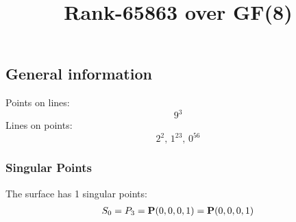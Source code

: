 \documentclass{article}
\newcommand\setTBstruts{\def\T{\rule{0pt}{2.6ex}}%
\def\B{\rule[-1.2ex]{0pt}{0pt}}}
\newcommand{\bP}{{\bf P}}
\begin{document}
 
\setTBstruts



{\allowdisplaybreaks%






\title{Rank-65863 over GF(8)}
\author{}%
\maketitle%
%
{}



\subsection*{General information}
Points on lines:
$$
9^3$$
Lines on points:
$$
2^2,\,1^{23},\,0^{56}$$
\subsubsection*{Singular Points}
The surface has 1 singular points:\\
\begin{align*}
S_{0} &= P_{3}=\bP(0, 0, 0, 1) = \bP(0, 0, 0, 1)\\
\end{align*}
}
\end{document}
